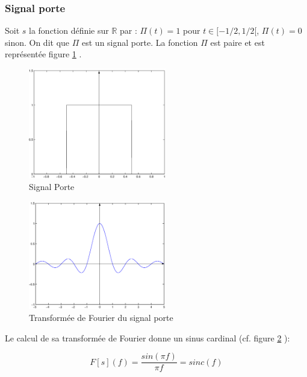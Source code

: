 \subsubsection{Signal porte}
Soit $s$ la fonction définie sur $\mathbb{R}$ par : $\Pi(t)=1$ pour $t\in[-1/2,1/2[$,
$\Pi(t)=0$ sinon. On dit que $\Pi$ est un signal porte. La fonction $\Pi$ est paire et est représentée figure \ref{Porte} .
%
%
\begin{figure}[htbp]
\centering
\includegraphics[width=6cm]{porte.eps}
\caption{Signal Porte}
\label{Porte}
\end{figure}
\begin{figure}[htbp]
\centerline{
\includegraphics[width=6cm]{sinca.eps}}
\caption{Transformée de Fourier du signal porte}
\label{sinca}
\end{figure}

Le calcul de sa transformée de Fourier donne un sinus cardinal (cf. figure \ref{sinca} ):

$$F[s](f)=\frac{sin(\pi f)}{\pi f}= sinc(f)$$


